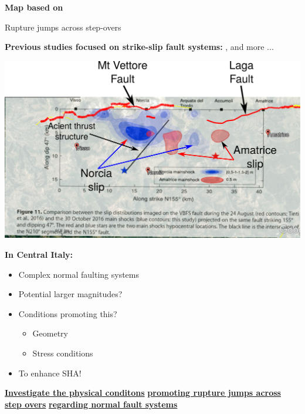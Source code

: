 \documentclass{beamer}
\begin{document}
\begin{frame}
\begin{center}
\begin{center}
\begin{minipage}{0.33\linewidth}
  \vskip 0.2cm
  {\bf \tiny Map based on \cite{Walker_2021_FAULT2SHA}} \end{minipage}
 \end{center}
 \end{center}
  \addtocounter{framenumber}{-1}
  
\end{frame}


\begin{frame}
 {Rupture jumps across step-overs}

  {\scriptsize \textbf{Previous studies focused on strike-slip fault systems:} \cite{Galis_2015_ISS,Hu_2016_IEJ,Bai_2017_ESD,Li_2020_ERT,Oglesby_2008_RTJ}, and more ... } \pause
 \vskip 0.2cm
 \begin{minipage}{0.45\linewidth}
  \includegraphics[width=1\linewidth]{images/amatrice_4.pdf}
 \end{minipage}
 \begin{minipage}{0.52\linewidth}
  {\bf \footnotesize In Central Italy:}
  \begin{itemize}
   \footnotesize \item \footnotesize Complex normal faulting systems  \pause
   \footnotesize \item \footnotesize Potential larger magnitudes? \pause
   \item \footnotesize Conditions promoting this? \pause
   \begin{itemize}
   \vskip 0.3cm
    \item \footnotesize Geometry \pause
    \item \footnotesize Stress conditions \pause
   \end{itemize}
   \vskip 0.3cm
   \item \footnotesize To enhance SHA! \pause
  \end{itemize}
 \end{minipage}

 \begin{center}
 \vskip 0.3cm
   \underline{\bf \small Investigate the physical conditons}
   \underline{\bf \small promoting rupture jumps across step overs} 
   \underline{\bf \small regarding normal fault systems} 
  \vskip 0.3cm
  
 \end{center}
 
\end{frame}
\end{document}
